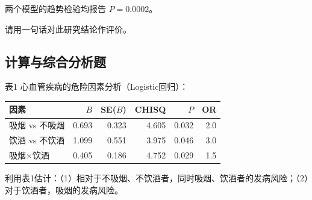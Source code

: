 两个模型的趋势检验均报告 \(P=0.0002\)。


\par\addvspace{8pt}\noindent\begin{minipage}{\linewidth}


请用一句话对此研究结论作评价。



\end{minipage}\par\vspace{5pt}

\par\addvspace{8pt}\noindent\begin{minipage}{\linewidth}

\subsection{计算与综合分析题}


表1 心血管疾病的危险因素分析（Logistic回归）：

\begin{center}\small\setlength{\tabcolsep}{4pt}\renewcommand{\arraystretch}{1.22}\begin{tabular}{@{}lrrrrr@{}}
\toprule
因素 & \(B\) & SE(\(B\)) & CHISQ & \(P\) & OR \\
\midrule

吸烟 vs 不吸烟 & 0.693 & 0.323 & 4.605 & 0.032 & 2.0 \\
饮酒 vs 不饮酒 & 1.099 & 0.551 & 3.975 & 0.046 & 3.0 \\
吸烟\(\times\)饮酒 & 0.405 & 0.186 & 4.752 & 0.029 & 1.5 \\
\bottomrule\end{tabular}\end{center}

利用表1估计：（1）相对于不吸烟、不饮酒者，同时吸烟、饮酒者的发病风险；（2）对于饮酒者，吸烟的发病风险。



\end{minipage}\par\vspace{5pt}

